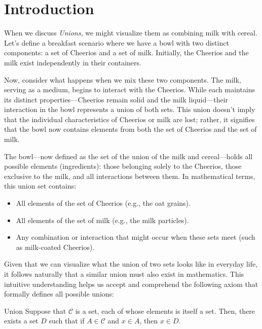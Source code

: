 \renewcommand{\theenumi}{\arabic{enumi}}
\renewcommand{\labelenumi}{\theenumi.}
\section{Introduction}

    When we discuss \textit{Unions}, we might visualize them as combining milk with cereal. Let's define a breakfast scenario where we have a bowl with two distinct components: a set of Cheerios and a set of milk. Initially, the Cheerios and the milk exist independently in their containers.

Now, consider what happens when we mix these two components. The milk, serving as a medium, begins to interact with the Cheerios. While each maintains its distinct properties---Cheerios remain solid and the milk liquid---their interaction in the bowl represents a union of both sets. This union doesn't imply that the individual characteristics of Cheerios or milk are lost; rather, it signifies that the bowl now contains elements from both the set of Cheerios and the set of milk.

The bowl---now defined as the set of the union of the milk and cereal---holds all possible elements (ingredients): those belonging solely to the Cheerios, those exclusive to the milk, and all interactions between them. In mathematical terms, this union set contains:
\begin{itemize} 
    \item All elements of the set of Cheerios (e.g., the oat grains).
    \item All elements of the set of milk (e.g., the milk particles).
    \item Any combination or interaction that might occur when these sets meet (such as milk-coated Cheerios).
\end{itemize}

\indent Given that we can visualize what the union of two sets looks like in everyday life, it follows naturally that a similar union must also exist in mathematics. This intuitive understanding helps us accept and comprehend the following axiom that formally defines all possible unions:

\begin{axiom}{Union}
    Suppose that \(\mathcal{C}\) is a set, each of whose elements is itself a set. Then, there exists a set \(D\) such that if \(A \in \mathcal{C}\) and \(x \in A\), then \(x \in D\).
\end{axiom}

